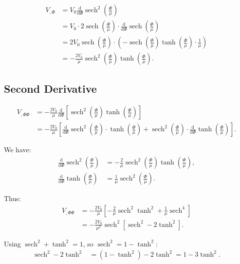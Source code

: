 \documentclass[11pt,a4paper]{article}
\numberwithin{equation}{section}
\theoremstyle{plain}
\theoremstyle{definition}
\theoremstyle{remark}
\newcommand{\dd}{\mathrm{d}}
\begin{document}
\begin{align}
V_{,\Phi} &= V_0\frac{\dd}{\dd\Phi}\operatorname{sech}^2\left(\frac{\Phi}{\mu}\right)\\
&= V_0 \cdot 2\operatorname{sech}\left(\frac{\Phi}{\mu}\right)\cdot\frac{\dd}{\dd\Phi}\operatorname{sech}\left(\frac{\Phi}{\mu}\right)\\
&= 2V_0\operatorname{sech}\left(\frac{\Phi}{\mu}\right)\cdot\left(-\operatorname{sech}\left(\frac{\Phi}{\mu}\right)\tanh\left(\frac{\Phi}{\mu}\right)\cdot\frac{1}{\mu}\right)\\
&= -\frac{2V_0}{\mu}\operatorname{sech}^2\left(\frac{\Phi}{\mu}\right)\tanh\left(\frac{\Phi}{\mu}\right).
\end{align}

\subsection{Second Derivative}

\begin{align}
V_{,\Phi\Phi} &= -\frac{2V_0}{\mu}\frac{\dd}{\dd\Phi}\left[\operatorname{sech}^2\left(\frac{\Phi}{\mu}\right)\tanh\left(\frac{\Phi}{\mu}\right)\right]\\
&= -\frac{2V_0}{\mu}\left[\frac{\dd}{\dd\Phi}\operatorname{sech}^2\left(\frac{\Phi}{\mu}\right)\cdot\tanh\left(\frac{\Phi}{\mu}\right) + \operatorname{sech}^2\left(\frac{\Phi}{\mu}\right)\cdot\frac{\dd}{\dd\Phi}\tanh\left(\frac{\Phi}{\mu}\right)\right].
\end{align}

We have:
\begin{align}
\frac{\dd}{\dd\Phi}\operatorname{sech}^2\left(\frac{\Phi}{\mu}\right) &= -\frac{2}{\mu}\operatorname{sech}^2\left(\frac{\Phi}{\mu}\right)\tanh\left(\frac{\Phi}{\mu}\right),\\
\frac{\dd}{\dd\Phi}\tanh\left(\frac{\Phi}{\mu}\right) &= \frac{1}{\mu}\operatorname{sech}^2\left(\frac{\Phi}{\mu}\right).
\end{align}

Thus:
\begin{align}
V_{,\Phi\Phi} &= -\frac{2V_0}{\mu}\left[-\frac{2}{\mu}\operatorname{sech}^2\tanh^2 + \frac{1}{\mu}\operatorname{sech}^4\right]\\
&= -\frac{2V_0}{\mu^2}\operatorname{sech}^2\left[\operatorname{sech}^2 - 2\tanh^2\right].
\end{align}

Using $\operatorname{sech}^2 + \tanh^2 = 1$, so $\operatorname{sech}^2 = 1 - \tanh^2$:
\begin{align}
\operatorname{sech}^2 - 2\tanh^2 &= (1 - \tanh^2) - 2\tanh^2 = 1 - 3\tanh^2.
\end{align}
\end{document}
